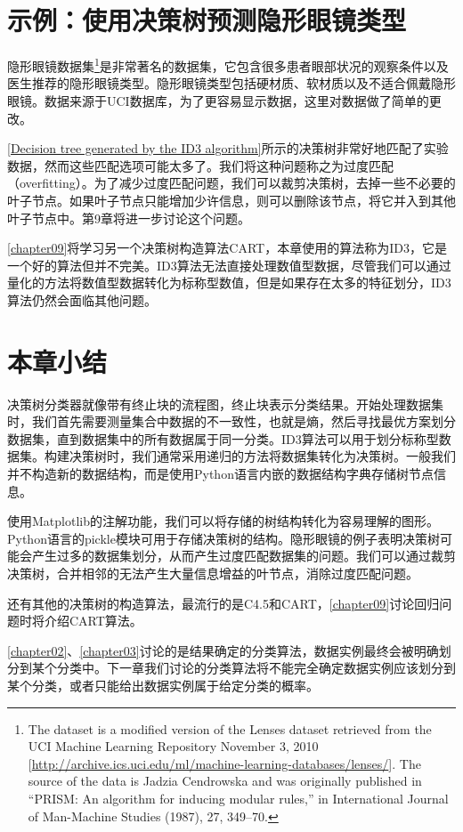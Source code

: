 \section{示例：使用决策树预测隐形眼镜类型}
隐形眼镜数据集\footnote{The dataset is a modified version of the Lenses dataset retrieved from the UCI Machine Learning Repository November 3, 2010 [\url{http://archive.ics.uci.edu/ml/machine-learning-databases/lenses/}]. The source of the data is Jadzia Cendrowska and was originally published in “PRISM: An algorithm for inducing modular rules,” in International Journal of Man-Machine Studies (1987), 27, 349–70.}是非常著名的数据集，它包含很多患者眼部状况的观察条件以及医生推荐的隐形眼镜类型。隐形眼镜类型包括硬材质、软材质以及不适合佩戴隐形眼镜。数据来源于UCI数据库，为了更容易显示数据，这里对数据做了简单的更改。

\autoref{Decision tree generated by the ID3 algorithm}所示的决策树非常好地匹配了实验数据，然而这些匹配选项可能太多了。我们将这种问题称之为过度匹配（overfitting）。为了减少过度匹配问题，我们可以裁剪决策树，去掉一些不必要的叶子节点。如果叶子节点只能增加少许信息，则可以删除该节点，将它并入到其他叶子节点中。第9章将进一步讨论这个问题。

\autoref{chapter09}将学习另一个决策树构造算法CART，本章使用的算法称为ID3，它是一个好的算法但并不完美。ID3算法无法直接处理数值型数据，尽管我们可以通过量化的方法将数值型数据转化为标称型数值，但是如果存在太多的特征划分，ID3算法仍然会面临其他问题。
\section{本章小结}
决策树分类器就像带有终止块的流程图，终止块表示分类结果。开始处理数据集时，我们首先需要测量集合中数据的不一致性，也就是熵，然后寻找最优方案划分数据集，直到数据集中的所有数据属于同一分类。ID3算法可以用于划分标称型数据集。构建决策树时，我们通常采用递归的方法将数据集转化为决策树。一般我们并不构造新的数据结构，而是使用Python语言内嵌的数据结构字典存储树节点信息。

使用Matplotlib的注解功能，我们可以将存储的树结构转化为容易理解的图形。Python语言的pickle模块可用于存储决策树的结构。隐形眼镜的例子表明决策树可能会产生过多的数据集划分，从而产生过度匹配数据集的问题。我们可以通过裁剪决策树，合并相邻的无法产生大量信息增益的叶节点，消除过度匹配问题。

还有其他的决策树的构造算法，最流行的是C4.5和CART，\autoref{chapter09}讨论回归问题时将介绍CART算法。

\autoref{chapter02}、\autoref{chapter03}讨论的是结果确定的分类算法，数据实例最终会被明确划分到某个分类中。下一章我们讨论的分类算法将不能完全确定数据实例应该划分到某个分类，或者只能给出数据实例属于给定分类的概率。